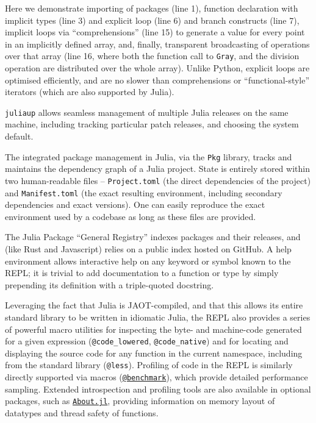 \documentclass{webofc}
\begin{document}
Here we demonstrate importing of packages (line 1), function declaration with
implicit types (line 3) and explicit loop (line 6) and branch constructs (line
7), implicit loops via ``comprehensions'' (line 15) to generate a  value for
every point in an implicitly defined array, and, finally, transparent
broadcasting of operations over that array (line 16, where both the function call to
\texttt{Gray}, and the division operation are distributed over the whole array). Unlike
Python, explicit loops are optimised efficiently, and are no slower than
comprehensions or ``functional-style'' iterators (which are also supported by
Julia).


\texttt{juliaup} allows seamless management of multiple Julia releases on the same
machine, including tracking particular patch releases, and choosing the system
default.

The integrated package management in Julia, via the \texttt{Pkg} library, tracks and
maintains the dependency graph of a Julia project. State is entirely stored
within two human-readable files -- \texttt{Project.toml} (the direct
dependencies of the project) and \texttt{Manifest.toml} (the exact
resulting environment, including secondary dependencies and exact versions).
One can easily reproduce the exact environment used by
a codebase as long as these files are provided.

The Julia Package ``General Registry'' indexes packages and their releases, and
(like Rust and Javascript) relies on a public index
hosted on GitHub. A help environment allows interactive help on any keyword
or symbol known to the REPL; it is trivial to add documentation to a function or
type by simply prepending its definition with a triple-quoted docstring.

Leveraging the fact that Julia is JAOT-compiled, and that this allows its entire
standard library to be written in idiomatic Julia, the REPL also provides a
series of powerful macro utilities for inspecting the byte- and machine-code
generated for a given expression (\verb$@code_lowered$, \verb$@code_native$) and
for locating and displaying the source code for any function in the current
namespace, including from the standard library (\verb$@less$). Profiling of code
in the REPL is similarly directly supported via macros (\href{https://github.com/JuliaCI/BenchmarkTools.jl}{\texttt{@benchmark}}),
which provide detailed performance sampling. Extended introspection and
profiling tools are also available in optional packages, such as
\href{https://github.com/tecosaur/About.jl}{\texttt{About.jl}}, providing information on memory layout of datatypes and
thread safety of functions.
\end{document}
